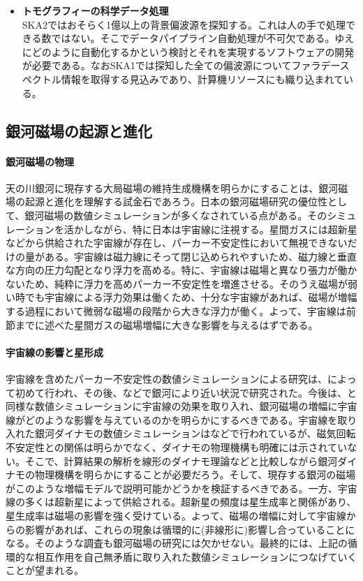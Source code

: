\begin{itemize}
\item {\bf トモグラフィーの科学データ処理}\\
SKA2ではおそらく1億以上の背景偏波源を探知する。これは人の手で処理できる数ではない。そこでデータパイプライン自動処理が不可欠である。ゆえにどのように自動化するかという検討とそれを実現するソフトウェアの開発が必要である。なおSKA1では探知した全ての偏波源についてファラデースペクトル情報を取得する見込みであり、計算機リソースにも織り込まれている。
\end{itemize}

\subsection{銀河磁場の起源と進化}
\label{c06.s3.ss2}

\paragraph{銀河磁場の物理}

天の川銀河に現存する大局磁場の維持生成機構を明らかにすることは、銀河磁場の起源と進化を理解する試金石であろう。日本の銀河磁場研究の優位性として、銀河磁場の数値シミュレーションが多くなされている点がある。そのシミュレーションを活かしながら、特に日本は宇宙線に注視する。星間ガスには超新星などから供給された宇宙線が存在し、パーカー不安定性において無視できないだけの量がある。宇宙線は磁力線にそって閉じ込められやすいため、磁力線と垂直な方向の圧力勾配となり浮力を高める\citep{1966ApJ...145..811P}。特に、宇宙線は磁場と異なり張力が働かないため、純粋に浮力を高めパーカー不安定性を増進させる。そのうえ磁場が弱い時でも宇宙線による浮力効果は働くため、十分な宇宙線があれば、磁場が増幅する過程において微弱な磁場の段階から大きな浮力が働く。よって、宇宙線は前節までに述べた星間ガスの磁場増幅に大きな影響を与えるはずである。

\paragraph{宇宙線の影響と星形成}

宇宙線を含めたパーカー不安定性の数値シミュレーションによる研究は、\cite{2004ApJ...607..828K}によって初めて行われ、その後、\cite{015105}などで銀河により近い状況で研究された。今後は、\cite{2006ApJ...641..862N}と同様な数値シミュレーションに宇宙線の効果を取り入れ、銀河磁場の増幅に宇宙線がどのような影響を与えているのかを明らかにするべきである。宇宙線を取り入れた銀河ダイナモの数値シミュレーションは\cite{2009ApJ...706L.155H}などで行われているが、磁気回転不安定性との関係は明らかでなく、ダイナモの物理機構も明確には示されていない。そこで、計算結果の解析を線形のダイナモ理論などと比較しながら銀河ダイナモの物理機構を明らかにすることが必要だろう。そして、現存する銀河の磁場がこのような増幅モデルで説明可能かどうかを検証するべきである。一方、宇宙線の多くは超新星によって供給される。超新星の頻度は星生成率と関係があり、星生成率は磁場の影響を強く受けている。よって、磁場の増幅に対して宇宙線からの影響があれば、これらの現象は循環的に(非線形に)影響し合っていることになる。そのような調査も銀河磁場の研究には欠かせない。最終的には、上記の循環的な相互作用を自己無矛盾に取り入れた数値シミュレーションにつなげていくことが望まれる。

